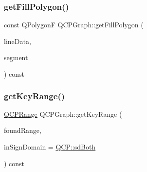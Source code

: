 \mbox{\label{class_q_c_p_graph_af73d5fe97cde966785bfd67201e44391}} 
\subsubsection{\texorpdfstring{getFillPolygon()}{getFillPolygon()}}
{\footnotesize\ttfamily const Q\+PolygonF Q\+C\+P\+Graph\+::get\+Fill\+Polygon (\begin{DoxyParamCaption}\item[{const Q\+Vector$<$ Q\+PointF $>$ $\ast$}]{line\+Data,  }\item[{\mbox{\hyperlink{class_q_c_p_data_range}{Q\+C\+P\+Data\+Range}}}]{segment }\end{DoxyParamCaption}) const\hspace{0.3cm}{\ttfamily [protected]}}

\mbox{\label{class_q_c_p_graph_aac47c6189e3aea46ea46939e5d14796c}} 
\subsubsection{\texorpdfstring{getKeyRange()}{getKeyRange()}}
{\footnotesize\ttfamily \mbox{\hyperlink{class_q_c_p_range}{Q\+C\+P\+Range}} Q\+C\+P\+Graph\+::get\+Key\+Range (\begin{DoxyParamCaption}\item[{bool \&}]{found\+Range,  }\item[{\mbox{\hyperlink{namespace_q_c_p_afd50e7cf431af385614987d8553ff8a9}{Q\+C\+P\+::\+Sign\+Domain}}}]{in\+Sign\+Domain = {\ttfamily \mbox{\hyperlink{namespace_q_c_p_afd50e7cf431af385614987d8553ff8a9aa38352ef02d51ddfa4399d9551566e24}{Q\+C\+P\+::sd\+Both}}} }\end{DoxyParamCaption}) const\hspace{0.3cm}{\ttfamily [virtual]}}

